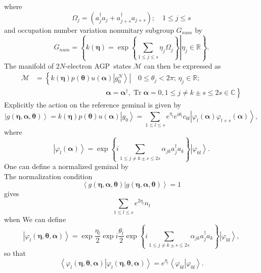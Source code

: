 \documentclass[aps,preprint]{revtex4}%
\begin{document}
where
\begin{equation}
\Omega_{j}=\left(  a_{j}^{\dagger}a_{j}+a_{j+s}^{\dagger}a_{j+s}\right)
;\quad1\leq j\leq s
\end{equation}
and occupation number variation nonunitary subgroup $G_{num}$ by
\begin{equation}
G_{num}=\left\{  \left.  k\left(  \bm{\eta}\right)  =\exp\left\{  \sum_{1\leq
j\leq s}\eta_{j}\Omega_{j}\right\}  \right\vert \eta_{j}\in\mathbb{R}\right\}
.\label{occup}%
\end{equation}
The manifold of $2N$-electron AGP\ states $\mathcal{M}$ can then be expressed
as
\begin{align}
\mathcal{M} &  \mathcal{=}\left\{  \left.  \overset{}{k\left(
\bm{\eta}\right)  p\left(  \bm{\theta}\right)  u\left(  \bm{\alpha}\right)
}\left\vert g_{0}^{N}\right\rangle \right\vert \quad0\leq\theta_{j}%
<2\pi;\,\eta_{j}\in\mathbb{R};\right.  \nonumber\\
&  \qquad\qquad\qquad\qquad\qquad\left.  \bm{\alpha}=\bm{\alpha }^{\dagger
},\operatorname{Tr}\bm{\alpha}=0,1\leq j\neq k\pm s\leq2s\in\mathbb{C}%
\right\}
\end{align}
Explicitly the action on the reference geminal is given by
\begin{equation}
\left\vert g\left(  \bm{\eta},\bm{\alpha},\bm{\theta}\right)  \right\rangle
=k\left(  \bm{\eta}\right)  p\left(  \bm{\theta}\right)  u\left(
\bm{\alpha}\right)  \left\vert g_{0}\right\rangle =\sum_{1\leq l\leq s}%
e^{\eta_{l}}e^{i\theta_{l}}c_{0l}\left\vert \varphi_{l}\left(
\bm{\alpha}\right)  \varphi_{l+s}\left(  \bm{\alpha}\right)  \right\rangle ,
\end{equation}
where
\begin{equation}
\left\vert \varphi_{l}\left(  \bm{\alpha}\right)  \right\rangle =\exp\left\{
i\sum_{1\leq j\neq k\pm s\leq2s}\alpha_{jk}a_{j}^{\dagger}a_{k}\right\}
\left\vert \varphi_{0l}\right\rangle .
\end{equation}
One can define a normalized geminal by
\begin{equation}
\end{equation}
The normalization condition
\begin{equation}
\left\langle \left.  g\left(  \bm{\eta},\bm{\alpha},\bm{\theta}\right)
\right\vert g\left(  \bm{\eta},\bm{\alpha},\bm{\theta}\right)  \right\rangle
=1
\end{equation}
gives
\begin{equation}
\sum_{1\leq l\leq s}e^{2\eta_{l}}n_{l}%
\end{equation}
when We can define%
\begin{equation}
\left\vert \varphi_{l}\left(  \bm{\eta,\theta,\alpha}\right)  \right\rangle
=\exp\frac{\eta_{l}}{2}\exp i\frac{\theta_{l}}{2}\exp\left\{  i\sum_{1\leq
j\neq k\pm s\leq2s}\alpha_{jk}a_{j}^{\dagger}a_{k}\right\}  \left\vert
\varphi_{0l}\right\rangle ,
\end{equation}
so that
\begin{equation}
\left\langle \left.  \varphi_{l}\left(  \bm{\eta,\theta,\alpha}\right)
\right\vert \varphi_{l}\left(  \bm{\eta,\theta,\alpha}\right)  \right\rangle
=e^{\eta_{l}}\left\langle \left.  \varphi_{0l}\right\vert \varphi
_{0l}\right\rangle .
\end{equation}
\end{document}
